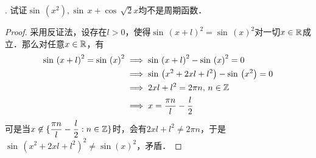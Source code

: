 . 试证$\sin \, \left(x^2\right), \sin \, x + \cos \, \sqrt{2}x$均不是周期函数．
\begin{proof}
采用反证法，设存在$l > 0$，使得$\sin \, \left(x+l\right)^2=\sin \, \left(x\right)^2$对一切$x \in \mathbb{R}$成立．那么对任意$x \in \mathbb{R}$，有
\begin{align}
    \sin \, \left(x+l\right)^2 = \sin \, \left(x\right)^2 &\implies \sin \, \left(x+l\right)^2-\sin \, \left(x\right)^2 = 0 \\
    &\implies \sin \, \left(x^2 + 2xl + l^2\right) - \sin \, \left(x^2\right) = 0 \\
    &\implies 2xl+l^2 = 2\pi n, \, n \in \mathbb{Z} \\
    &\implies x = \frac{\pi n}{l} - \frac{l}{2}
\end{align}
可是当$x \not\in \{ \displaystyle\frac{\pi n}{l} - \displaystyle\frac{l}{2} : n \in \mathbb{Z} \}$时，会有$2xl+l^2 \neq 2\pi n$，于是$\sin \, \left(x^2+2xl+l^2\right)^2 \neq \sin \left( x \right)^2$，矛盾．
\end{proof}
